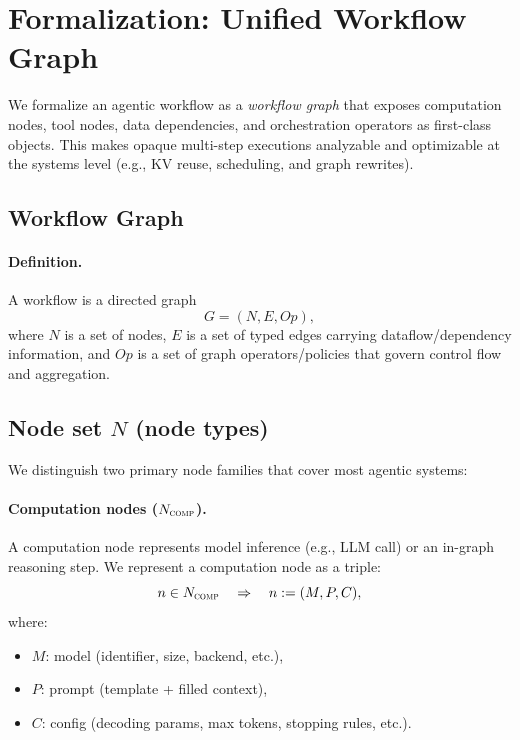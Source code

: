 
\section{Formalization: Unified Workflow Graph}
\label{sec:formalization}

We formalize an agentic workflow as a \emph{workflow graph} that exposes computation nodes, tool nodes, data dependencies, and orchestration operators as first-class objects. This makes opaque multi-step executions analyzable and optimizable at the systems level (e.g., KV reuse, scheduling, and graph rewrites). 

\subsection{Workflow Graph}
\label{subsec:wg}

\paragraph{Definition.}
A workflow is a directed graph
\begin{equation}
\label{eq:wg}
G = (N, E, Op),
\end{equation}
where $N$ is a set of nodes, $E$ is a set of typed edges carrying dataflow/dependency information, and $Op$ is a set of graph operators/policies that govern control flow and aggregation.

\subsection{Node set $N$ (node types)}
\label{subsec:nodes}

We distinguish two primary node families that cover most agentic systems:

\paragraph{Computation nodes ($N_{\textsc{comp}}$).}
A computation node represents model inference (e.g., LLM call) or an in-graph reasoning step.
We represent a computation node as a triple:
\begin{equation}
\label{eq:ncomp}
n \in N_{\textsc{comp}} \quad \Rightarrow \quad n := (M, P, C),
\end{equation}
where:
\begin{itemize}
    \item $M$: model (identifier, size, backend, etc.),
    \item $P$: prompt (template + filled context),
    \item $C$: config (decoding params, max tokens, stopping rules, etc.).
\end{itemize}


